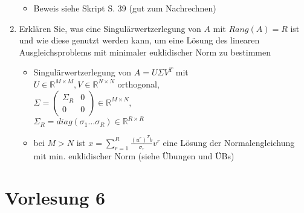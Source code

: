 \documentclass[]{article}
\begin{document}
\begin{enumerate}
\begin{itemize}
				\item Beweis siehe Skript S. 39 (gut zum Nachrechnen)
			\end{itemize}
		\item Erklären Sie, was eine Singulärwertzerlegung von $A$ mit $Rang(A) = R$ ist und wie diese genutzt werden kann, um eine Lösung des linearen Ausgleichsproblems mit minimaler euklidischer Norm zu bestimmen
			\begin{itemize}
				\item Singulärwertzerlegung von $A = U \Sigma V^T$ mit \\
				$U \in \mathbb{R}^{M \times M},V \in \mathbb{R}^{N \times N}$ orthogonal, \\
				$\Sigma = \left (\begin{array}{cc} \Sigma_R & 0 \\ 0&0 \end{array} \right) \in \mathbb{R}^{M \times N},$ \\ $\Sigma_R = diag(\sigma_1 \dots \sigma_R) \in \mathbb{R}^{R \times R}$
				\item bei $M>N$ ist $x = \sum_{r=1}^{R} \frac{(u^r)^Tb}{\sigma_r}v^r$ eine Lösung der Normalengleichung mit min. euklidischer Norm (siehe Übungen und ÜBs)
			\end{itemize}
	\end{enumerate}

\section{Vorlesung 6}
\end{document}
